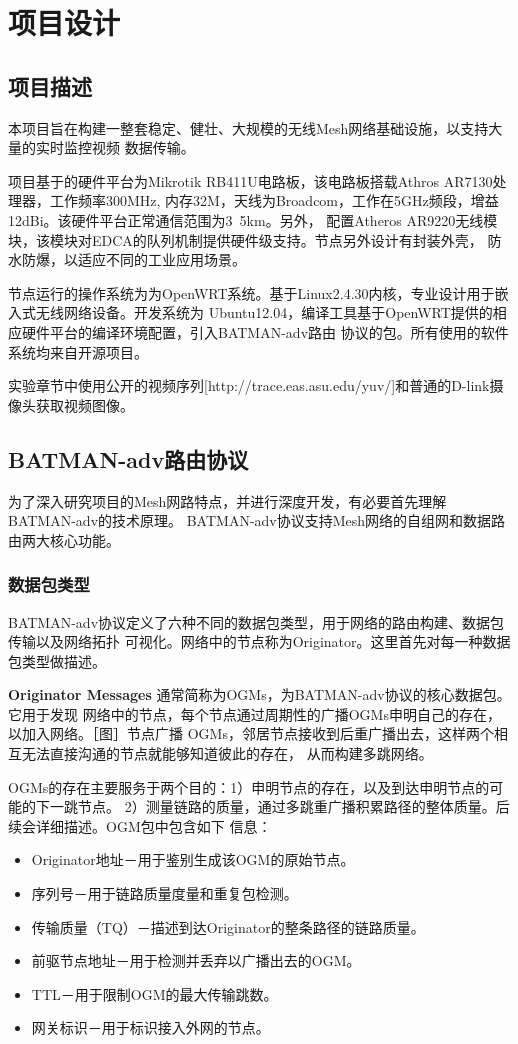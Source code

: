 \chapter{项目设计}
\label{cha:project_design}

\section{项目描述}
本项目旨在构建一整套稳定、健壮、大规模的无线Mesh网络基础设施，以支持大量的实时监控视频
数据传输。

项目基于的硬件平台为Mikrotik RB411U电路板，该电路板搭载Athros AR7130处理器，工作频率300MHz,
内存32M，天线为Broadcom，工作在5GHz频段，增益12dBi。该硬件平台正常通信范围为3~5km。另外，
配置Atheros AR9220无线模块，该模块对EDCA的队列机制提供硬件级支持。节点另外设计有封装外壳，
防水防爆，以适应不同的工业应用场景。

节点运行的操作系统为为OpenWRT系统。基于Linux2.4.30内核，专业设计用于嵌入式无线网络设备。开发系统为
Ubuntu12.04，编译工具基于OpenWRT提供的相应硬件平台的编译环境配置，引入BATMAN-adv路由
协议的包。所有使用的软件系统均来自开源项目。

实验章节中使用公开的视频序列[http://trace.eas.asu.edu/yuv/]和普通的D-link摄像头获取视频图像。

\section{BATMAN-adv路由协议}
为了深入研究项目的Mesh网路特点，并进行深度开发，有必要首先理解BATMAN-adv的技术原理。
BATMAN-adv协议支持Mesh网络的自组网和数据路由两大核心功能。

\subsection{数据包类型}
BATMAN-adv协议定义了六种不同的数据包类型，用于网络的路由构建、数据包传输以及网络拓扑
可视化。网络中的节点称为Originator。这里首先对每一种数据包类型做描述。

\textbf{Originator Messages} 通常简称为OGMs，为BATMAN-adv协议的核心数据包。它用于发现
网络中的节点，每个节点通过周期性的广播OGMs申明自己的存在，以加入网络。［图］节点广播
OGMs，邻居节点接收到后重广播出去，这样两个相互无法直接沟通的节点就能够知道彼此的存在，
从而构建多跳网络。

OGMs的存在主要服务于两个目的：1）申明节点的存在，以及到达申明节点的可能的下一跳节点。
2）测量链路的质量，通过多跳重广播积累路径的整体质量。后续会详细描述。OGM包中包含如下
信息：
\begin{itemize}
\item Originator地址－用于鉴别生成该OGM的原始节点。
\item 序列号－用于链路质量度量和重复包检测。
\item 传输质量（TQ）－描述到达Originator的整条路径的链路质量。
\item 前驱节点地址－用于检测并丢弃以广播出去的OGM。
\item TTL－用于限制OGM的最大传输跳数。
\item 网关标识－用于标识接入外网的节点。
\end{itemize}


